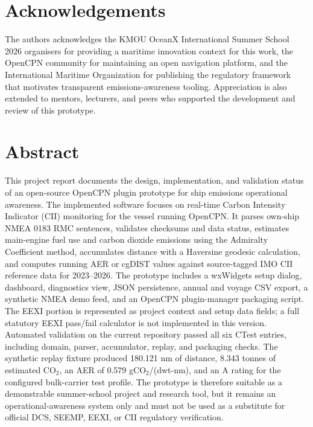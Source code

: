 \documentclass[12pt, a4paper]{report}
\begin{document}
\newpage

\chapter*{Acknowledgements}

The authors acknowledges the KMOU OceanX International Summer School 2026 organisers for providing a maritime innovation context for this work, the OpenCPN community for maintaining an open navigation platform, and the International Maritime Organization for publishing the regulatory framework that motivates transparent emissions-awareness tooling. Appreciation is also extended to mentors, lecturers, and peers who supported the development and review of this prototype.

\newpage

\chapter*{Abstract}

This project report documents the design, implementation, and validation status of an open-source OpenCPN plugin prototype for ship emissions operational awareness. The implemented software focuses on real-time Carbon Intensity Indicator (CII) monitoring for the vessel running OpenCPN. It parses own-ship NMEA 0183 RMC sentences, validates checksums and data status, estimates main-engine fuel use and carbon dioxide emissions using the Admiralty Coefficient method, accumulates distance with a Haversine geodesic calculation, and computes running AER or cgDIST values against source-tagged IMO CII reference data for 2023--2026. The prototype includes a wxWidgets setup dialog, dashboard, diagnostics view, JSON persistence, annual and voyage CSV export, a synthetic NMEA demo feed, and an OpenCPN plugin-manager packaging script. The EEXI portion is represented as project context and setup data fields; a full statutory EEXI pass/fail calculator is not implemented in this version. Automated validation on the current repository passed all six CTest entries, including domain, parser, accumulator, replay, and packaging checks. The synthetic replay fixture produced 180.121 nm of distance, 8.343 tonnes of estimated CO$_2$, an AER of 0.579 gCO$_2$/(dwt-nm), and an A rating for the configured bulk-carrier test profile. The prototype is therefore suitable as a demonstrable summer-school project and research tool, but it remains an operational-awareness system only and must not be used as a substitute for official DCS, SEEMP, EEXI, or CII regulatory verification.
\end{document}
